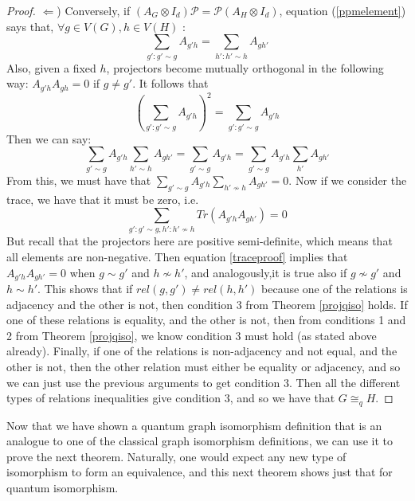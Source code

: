 \documentclass[12pt]{article}
\begin{document}
\begin{proof}
$\Leftarrow$) Conversely, if $(A_G \otimes I_d)\mathcal{P} = \mathcal{P} (A_H \otimes I_d)$, equation (\ref{ppmelement}) says that, $\forall g \in V(G), h \in V(H)$ :
\begin{equation}
\sum_{g':g' \sim g} A_{g'h} = \sum_{h':h' \sim h} A_{gh'} 
\end{equation}
Also, given a fixed $h$, projectors become mutually orthogonal in the following way: $A_{g'h}A_{gh}=0$ if $g \neq g'$. It follows that 
\begin{equation}
(\sum_{g':g' \sim g} A_{g'h})^2 = \sum_{g':g' \sim g} A_{g'h}
\end{equation}
Then we can say:
\begin{equation}
\sum_{g' \sim g} A_{g'h} \sum_{h' \sim h} A_{gh'} = \sum_{g' \sim g} A_{g'h}= \sum_{g' \sim g} A_{g'h} \sum_{h'} A_{gh'}
\end{equation}
From this, we must have that $\sum_{g' \sim g} A_{g'h} \sum_{h' \nsim h} A_{gh'} = 0$. Now if we consider the trace, we have that it must be zero, i.e.
\begin{equation} \label{traceproof}
\sum_{g':g' \sim g, h':h' \nsim h} Tr(A_{g'h}A_{gh'}) = 0
\end{equation}
But recall that the projectors here are positive semi-definite, which means that all elements are non-negative. Then equation \ref{traceproof} implies that $A_{g'h}A_{gh'} = 0$ when $g \sim g'$ and $h \nsim h'$, and analogously,it is true also if $g \nsim g'$ and $h \sim h'$. This shows that if $rel(g,g') \neq rel(h,h')$ because one of the relations is adjacency and the other is not, then condition 3 from Theorem \ref{projqiso} holds. If one of these relations is equality, and the other is not, then from conditions 1 and 2 from Theorem \ref{projqiso}, we know condition 3 must hold (as stated above already). Finally, if one of the relations is non-adjacency and not equal, and the other is not, then the other relation must either be equality or adjacency, and so we can just use the previous arguments to get condition 3. Then all the different types of relations inequalities give condition 3, and so we have that $G \cong_q H$. 
\end{proof}

Now that we have shown a quantum graph isomorphism definition that is an analogue to one of the classical graph isomorphism definitions, we can use it to prove the next theorem. Naturally, one would expect any new type of isomorphism to form an equivalence, and this next theorem shows just that for quantum isomorphism. 
\end{document}
